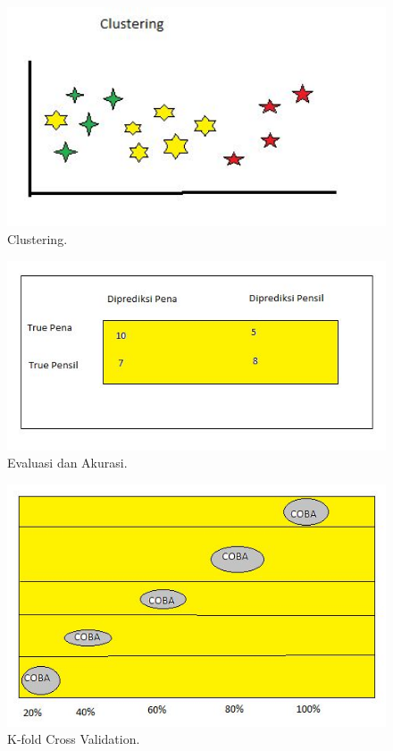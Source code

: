 \begin{figure}[ht]
		\centerline{\includegraphics[width=1\textwidth]{figures/huda/clustering.JPG}}
		\caption{Clustering.}
		\label{4}
\end{figure}
\begin{figure}[ht]
		\centerline{\includegraphics[width=1\textwidth]{figures/huda/evaluasidanakurasi.JPG}}
		\caption{Evaluasi dan Akurasi.}
		\label{5}
\end{figure}
\begin{figure}[ht]
		\centerline{\includegraphics[width=1\textwidth]{figures/huda/K-fold.JPG}}
		\caption{K-fold Cross Validation.}
		\label{6}
\end{figure}

